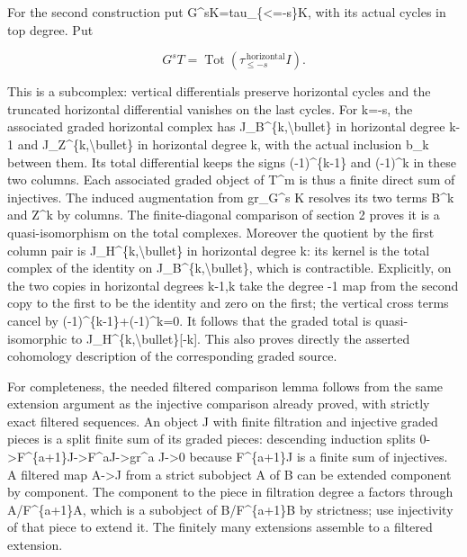 \documentclass[11pt]{article}
\begin{document}
For the second construction put G\textasciicircum{}sK\allowbreak{}=tau\_\allowbreak{}\{<\allowbreak{}=-s\}K,\allowbreak{} with its actual cycles in top degree. Put

\[
 G^sT=\operatorname{Tot}(\tau_{\le -s}^{\,\mathrm{horizontal}} I).
                                                                    \tag{3.1}
\]

This is a subcomplex:\allowbreak{} vertical differentials preserve horizontal cycles and the truncated horizontal differential vanishes on the last cycles. For k\allowbreak{}=-s,\allowbreak{} the associated graded horizontal complex has J\_\allowbreak{}B\textasciicircum{}\{k,\allowbreak{}\textbackslash{}bullet\} in horizontal degree k-1 and J\_\allowbreak{}Z\textasciicircum{}\{k,\allowbreak{}\textbackslash{}bullet\} in horizontal degree k,\allowbreak{} with the actual inclusion b\_\allowbreak{}k between them. Its total differential keeps the signs (-1)\allowbreak{}\textasciicircum{}\{k-1\} and (-1)\allowbreak{}\textasciicircum{}k in these two columns. Each associated graded object of T\^{}m is thus a finite direct sum of injectives. The induced augmentation from gr\_\allowbreak{}G\textasciicircum{}s K resolves its two terms B\^{}k and Z\^{}k by columns. The finite-diagonal comparison of section 2 proves it is a quasi-isomorphism on the total complexes. Moreover the quotient by the first column pair is J\_\allowbreak{}H\textasciicircum{}\{k,\allowbreak{}\textbackslash{}bullet\} in horizontal degree k:\allowbreak{} its kernel is the total complex of the identity on J\_\allowbreak{}B\textasciicircum{}\{k,\allowbreak{}\textbackslash{}bullet\},\allowbreak{} which is contractible. Explicitly,\allowbreak{} on the two copies in horizontal degrees k-1,\allowbreak{}k take the degree -1 map from the second copy to the first to be the identity and zero on the first; the vertical cross terms cancel by (-1)\allowbreak{}\textasciicircum{}\{k-1\}\allowbreak{}+(-1)\allowbreak{}\textasciicircum{}k\allowbreak{}=0. It follows that the graded total is quasi-isomorphic to J\_\allowbreak{}H\textasciicircum{}\{k,\allowbreak{}\textbackslash{}bullet\}[-k]\allowbreak{}. This also proves directly the asserted cohomology description of the corresponding graded source.

For completeness,\allowbreak{} the needed filtered comparison lemma follows from the same extension argument as the injective comparison already proved,\allowbreak{} with strictly exact filtered sequences. An object J with finite filtration and injective graded pieces is a split finite sum of its graded pieces:\allowbreak{} descending induction splits 0\allowbreak{}->F\textasciicircum{}\{a\allowbreak{}+1\}J\allowbreak{}->F\textasciicircum{}aJ\allowbreak{}->gr\textasciicircum{}a J\allowbreak{}->0 because F\textasciicircum{}\{a\allowbreak{}+1\}J is a finite sum of injectives. A filtered map A\allowbreak{}->J from a strict subobject A of B can be extended component by component. The component to the piece in filtration degree a factors through A/\allowbreak{}F\textasciicircum{}\{a\allowbreak{}+1\}A,\allowbreak{} which is a subobject of B/\allowbreak{}F\textasciicircum{}\{a\allowbreak{}+1\}B by strictness; use injectivity of that piece to extend it. The finitely many extensions assemble to a filtered extension.
\end{document}
